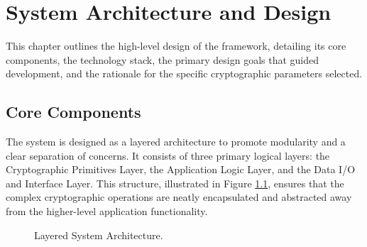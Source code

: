 \chapter{System Architecture and Design}
This chapter outlines the high-level design of the framework, detailing its core components, the technology stack, the primary design goals that guided development, and the rationale for the specific cryptographic parameters selected.

\section{Core Components}
The system is designed as a layered architecture to promote modularity and a clear separation of concerns. It consists of three primary logical layers: the Cryptographic Primitives Layer, the Application Logic Layer, and the Data I/O and Interface Layer. This structure, illustrated in Figure \ref{fig:architecture}, ensures that the complex cryptographic operations are neatly encapsulated and abstracted away from the higher-level application functionality.



\begin{figure}[h!]
	\centering
	\caption{Layered System Architecture.}
	\label{fig:architecture}
\end{figure}


